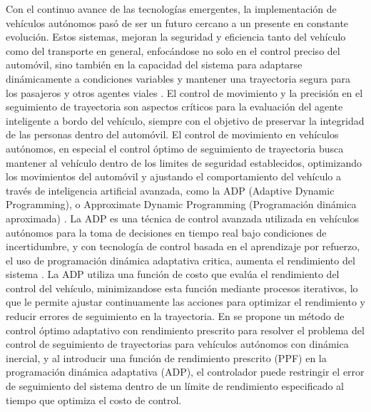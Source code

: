 \documentclass[conference]{IEEEtran}
\begin{document}
Con el continuo avance de las tecnologías emergentes, la implementación de vehículos autónomos pasó de ser un futuro cercano a un presente en constante evolución. Estos sistemas, mejoran la seguridad y eficiencia tanto del vehículo como del transporte en general, enfocándose no solo en el control preciso del automóvil, sino también en la capacidad del sistema para adaptarse dinámicamente a condiciones variables y mantener una trayectoria segura para los pasajeros y otros agentes viales \cite{arshad2020clothoid}. El control de movimiento y la precisión en el seguimiento de trayectoria son aspectos críticos para la evaluación del agente inteligente a bordo del vehículo, siempre con el objetivo de preservar la integridad de las personas dentro del automóvil. El control de movimiento en vehículos autónomos, en especial el control óptimo de seguimiento de trayectoria busca mantener al vehículo dentro de los limites de seguridad establecidos, optimizando los movimientos del automóvil y ajustando el comportamiento del vehículo a través de inteligencia artificial avanzada, como la ADP (Adaptive Dynamic Programming), o Approximate Dynamic Programming (Programación dinámica aproximada) \cite{ADP_A}. La ADP es una técnica de control avanzada utilizada en vehículos autónomos para la toma de decisiones en tiempo real bajo condiciones de incertidumbre, y con tecnología de control basada en el aprendizaje por refuerzo, el uso de programación dinámica adaptativa critica, aumenta el rendimiento del sistema \cite{Smart_Car_ADP, ADP_Inf}. La ADP utiliza una función de costo que evalúa el rendimiento del control del vehículo, minimizandose esta función mediante procesos iterativos, lo que le permite ajustar continuamente las acciones para optimizar el rendimiento y reducir errores de seguimiento en la trayectoria. En \cite{Smart_Car_ADP} se propone un método de control óptimo adaptativo con rendimiento prescrito para resolver el problema del control de seguimiento de trayectorias para vehículos autónomos con dinámica inercial, y al introducir una función de rendimiento prescrito (PPF) en la programación dinámica adaptativa (ADP), el controlador puede restringir el error de seguimiento del sistema dentro de un límite de rendimiento especificado al tiempo que optimiza el costo de control.


\end{document}
